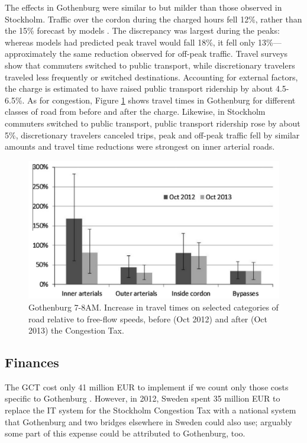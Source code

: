 The effects in Gothenburg were similar to but milder than those observed in Stockholm. Traffic over the cordon during the charged hours fell 12\%, rather than the 15\% forecast by models \citep{Borjesson2015}. The discrepancy was largest during the peaks: whereas models had predicted peak travel would fall 18\%, it fell only 13\%---approximately the same reduction observed for off-peak traffic. Travel surveys show that commuters switched to public transport, while discretionary travelers traveled less frequently or switched destinations. Accounting for external factors, the charge is estimated to have raised public transport ridership by about 4.5-6.5\%. As for congestion, Figure \ref{fig:Gothenburg-travel-times} shows travel times in Gothenburg for different classes of road from before and after the charge. Likewise, in Stockholm commuters switched to public transport, public transport ridership rose by about 5\%, discretionary travelers canceled trips, peak and off-peak traffic fell by similar amounts and travel time reductions were strongest on inner arterial roads.

\begin{figure}[ht]
\includegraphics[width=0.55\columnwidth]{../img/gburg-travel-times.png}

\caption{Gothenburg 7-8AM. Increase in travel times on selected categories of road relative to free-flow speeds, before (Oct 2012) and after (Oct 2013) the Congestion Tax. \citep{Borjesson2015} \label{fig:Gothenburg-travel-times}}

\end{figure}

\subsection{Finances}

The GCT cost only 41 million EUR to implement if we count only those costs specific to Gothenburg \citep[p. 40]{Borjesson2018}. However, in 2012, Sweden spent 35 million EUR to replace the IT system for the Stockholm Congestion Tax with a national system that Gothenburg and two bridges elsewhere in Sweden could also use; arguably some part of this expense could be attributed to Gothenburg, too. 

